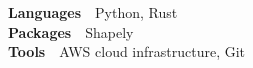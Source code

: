 

\begin{cvparagraph}

\textbf{Languages}~\textemdash~Python, Rust\\
\textbf{Packages}~\textemdash~Shapely\\
\textbf{Tools}~\textemdash~AWS cloud infrastructure, Git
\end{cvparagraph}